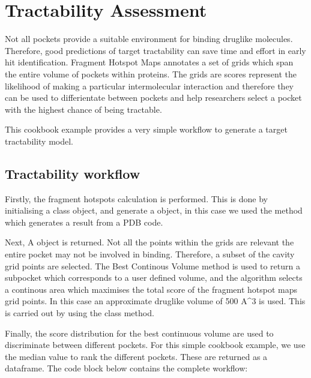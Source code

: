 \documentclass[letterpaper,10pt,english]{sphinxmanual}
\begin{document}
\section{Tractability Assessment}
\label{\detokenize{tutorial:tractability-assessment}}
Not all pockets provide a suitable environment for binding drug\sphinxhyphen{}like molecules. Therefore, good predictions
of target tractability can save time and effort in early hit identification. Fragment Hotspot Maps annotates a
set of grids which span the entire volume of pockets within proteins. The grids are scores represent the
likelihood of making a particular intermolecular interaction and therefore they can be used to differientate
between pockets and help researchers select a pocket with the highest chance of being tractable.

This cookbook example provides a very simple workflow to generate a target tractability model.


\subsection{Tractability workflow}
\label{\detokenize{tutorial:tractability-workflow}}
Firstly, the fragment hotspots calculation is performed. This is done by initialising a 
class object, and generate a  object, in this case we used the
 method which generates a result from a PDB code.

Next, A  object is returned. Not all the points within the grids
are relevant \sphinxhyphen{} the entire pocket may not be involved in binding. Therefore, a subset of the cavity grid points are
selected. The Best Continous Volume method is used to return a sub\sphinxhyphen{}pocket which corresponds to a user defined volume,
and the algorithm selects a continous area which maximises the total score of the fragment hotspot maps grid points. In
this case an approximate drug\sphinxhyphen{}like volume of 500 A\textasciicircum{}3 is used. This is carried out by using the
 class method.

Finally, the score distribution for the best continuous volume are used to discriminate between different pockets. For
this simple cookbook example, we use the median value to rank the different pockets. These are returned as a dataframe.
The code block below contains the complete workflow:
\end{document}
